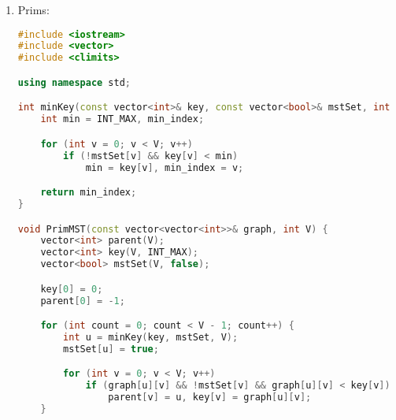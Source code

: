 \begin{enumerate}
\begin{lstlisting}[language=C++]
	if (subsets[xroot].rank < subsets[yroot].rank) {
		subsets[xroot].parent = yroot;
	} else if (subsets[xroot].rank > subsets[yroot].rank) {
		subsets[yroot].parent = xroot;
	} else {
		subsets[yroot].parent = xroot;
		subsets[xroot].rank++;
	}
}

void KruskalMST(Graph& graph) {
	vector<Edge> result;
	int V = graph.V;
	sort(graph.edges.begin(), graph.edges.end(), [](Edge a, Edge b) {
			return a.weight < b.weight;
			});

	subset* subsets = new subset[(V * sizeof(subset))];
	for (int v = 0; v < V; ++v) {
		subsets[v].parent = v;
		subsets[v].rank = 0;
	}

	for (Edge e : graph.edges) {
		int x = find(subsets, e.src);
		int y = find(subsets, e.dest);

		if (x != y) {
			result.push_back(e);
			Union(subsets, x, y);
		}
	}

	cout << "Edges in the MST:\n";
	for (Edge e : result) {
		cout << e.src << " -- " << e.dest << " == " << e.weight << endl;
	}

	delete[] subsets;
}

int main() {
	Graph graph;
	graph.V = 4;
	graph.E = 5;
	graph.edges = {
		{0, 1, 10},
		{0, 2, 6},
		{0, 3, 5},
		{1, 3, 15},
		{2, 3, 4}
	};

	KruskalMST(graph);

	return 0;
}

	\end{lstlisting}
	\item Prims:
	\begin{lstlisting}[language=C++]
	#include <iostream>
#include <vector>
#include <climits>

using namespace std;

int minKey(const vector<int>& key, const vector<bool>& mstSet, int V) {
    int min = INT_MAX, min_index;

    for (int v = 0; v < V; v++)
        if (!mstSet[v] && key[v] < min)
            min = key[v], min_index = v;

    return min_index;
}

void PrimMST(const vector<vector<int>>& graph, int V) {
    vector<int> parent(V);
    vector<int> key(V, INT_MAX);
    vector<bool> mstSet(V, false);

    key[0] = 0;
    parent[0] = -1;

    for (int count = 0; count < V - 1; count++) {
        int u = minKey(key, mstSet, V);
        mstSet[u] = true;

        for (int v = 0; v < V; v++)
            if (graph[u][v] && !mstSet[v] && graph[u][v] < key[v])
                parent[v] = u, key[v] = graph[u][v];
    }


\end{lstlisting}
\end{enumerate}
